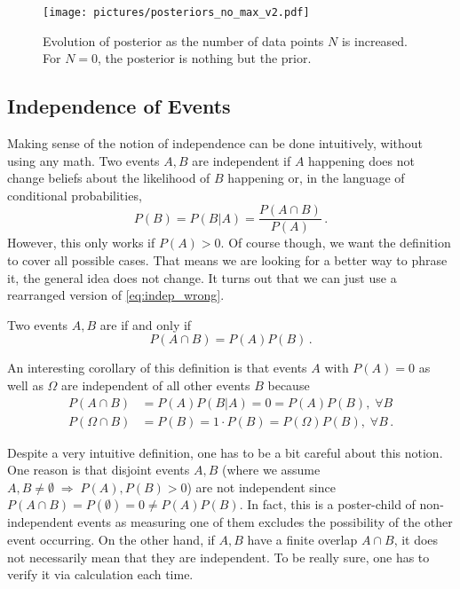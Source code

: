 

\begin{figure}[t]
\centering

\texttt{[image: pictures/posteriors\_no\_max\_v2.pdf]}

\caption{Evolution of posterior as the number of data points $N$ is increased. For $N = 0$, the posterior is nothing but the prior.}
\label{fig:posteriors}
\end{figure}



	\subsection{Independence of Events}
Making sense of the notion of independence can be done intuitively, without using any math. Two events $A, B$ are independent if $A$ happening does not change beliefs about the likelihood of $B$ happening or, in the language of conditional probabilities,
\begin{equation}\label{eq:indep_wrong}
P(B) = P(B | A) = \frac{P(A \cap B)}{P(A)} \, .
\end{equation}
However, this only works if $P(A) > 0$. Of course though, we want the definition to cover all possible cases. That means we are looking for a better way to phrase it, the general idea does not change. It turns out that we can just use a rearranged version of \eqref{eq:indep_wrong}.
\begin{defi}
Two events $A, B$ are  if and only if
\begin{equation}
P(A \cap B) = P(A) P(B) \, .
\end{equation}
\end{defi}

An interesting corollary of this definition is that events $A$ with $P(A) = 0$ as well as $\Omega$ are independent of all other events $B$ because
\begin{align*}
P(A \cap B) &= P(A) P(B | A) = 0 = P(A) P(B), \; \forall B
\\
P(\Omega \cap B) &= P(B) = 1 \cdot P(B) = P(\Omega) P(B), \; \forall B \, .
\end{align*}


Despite a very intuitive definition, one has to be a bit careful about this notion. One reason is that disjoint events $A, B$ (where we assume $A, B \neq \emptyset\; \Rightarrow \; P(A), P(B) > 0$) are not independent since $P(A \cap B) = P(\emptyset) = 0 \neq P(A) P(B)$. In fact, this is a poster-child of non-independent events as measuring one of them excludes the possibility of the other event occurring. On the other hand, if $A, B$ have a finite overlap $A \cap B$, it does not necessarily mean that they are independent. To be really sure, one has to verify it via calculation each time.

